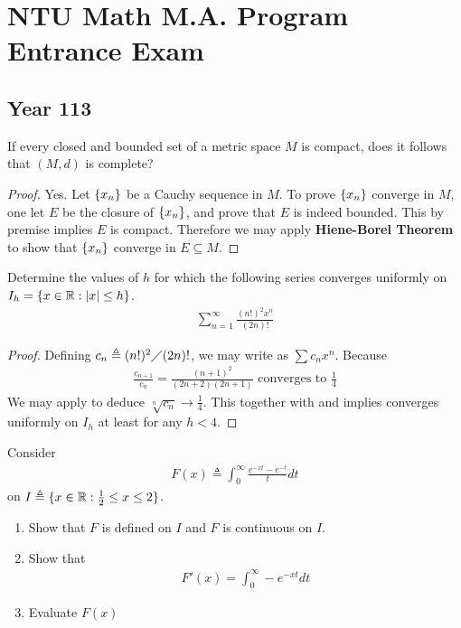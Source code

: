 \documentclass{report}
\begin{document}
\chapter{NTU Math M.A. Program Entrance Exam}
\section{Year 113}
\begin{question}{}{}
If every closed and bounded set of a metric space $M$ is compact, does it follows that $(M,d)$ is complete?  
\end{question}
\begin{proof}
  Yes. Let $\{ x_n \}$ be a Cauchy sequence in $M$. To prove $\{ x_n \}$ converge in $M$, one let  $E$ be the closure of  $\{ x_n \}$, and prove that $E$ is indeed bounded. This by premise implies $E$ is compact. Therefore we may apply \textbf{Hiene-Borel Theorem} to show that $\{ x_n \}$ converge in $E\subseteq M$. 
\end{proof}
\begin{question}{}{}
Determine the values of $h$ for which the following series converges uniformly on  $I_h=\{ x\in\mathbb{R}:\left|x\right|\leq h \}$.
\begin{align}
\label{tgq}
\sum_{n=1}^{\infty} \frac{(n!)^2x^n}{(2n)!}
\end{align}
\end{question}
\begin{proof}
Defining $c_n\triangleq (n!)^2 \diagup (2n)!$, we may write   as $\sum c_n x^n$. Because 
\begin{align*}
\frac{c_{n+1}}{c_n}= \frac{(n+1)^2}{(2n+2)(2n+1)}\text{ converges to }\frac{1}{4}
\end{align*}
We may apply  to deduce $\sqrt[n]{c_n}\rightarrow \frac{1}{4}$. This together with  and  implies  converges uniformly on $I_h$ at least for any $h<4$. 

\end{proof}
\begin{question}{}{}
Consider 
\begin{align*}
F(x)\triangleq \int_0^{\infty} \frac{e^{-xt}-e^{-t}}{t}dt
\end{align*}
on $I\triangleq \{ x\in\mathbb{R}:\frac{1}{2}\leq x\leq 2 \}$. 
\begin{enumerate}[label=(\roman*)]
  \item Show that $F$ is defined on $I$ and  $F$ is continuous on $I$.  
  \item Show that 
    \begin{align*}
    F'(x)=\int_0^{\infty} -e^{-xt} dt
    \end{align*} 
    \item Evaluate $F(x)$
\end{enumerate}
\end{question}
\end{document}
